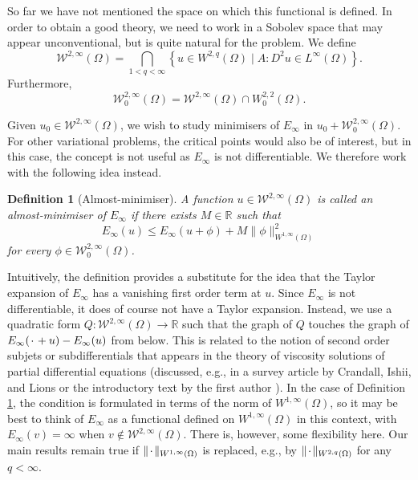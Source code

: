 \documentclass[a4paper]{article}
\newcommand{\R}{\mathbb{R}}
\newcommand{\W}{\mathcal{W}}
\newcommand{\blank}{{\mkern 2mu\cdot\mkern 2mu}}
\newcommand{\set}[2]{\left\{ #1 \mid #2 \right\}}
\newtheorem{definition}[theorem]{Definition}
\theoremstyle{remark}
\begin{document}
So far we have not mentioned the space on which this functional is defined.
In order to obtain a good theory, we need to work in a Sobolev space that
may appear unconventional, but is quite natural for the problem. We define
\[
\W^{2, \infty}(\Omega) = \bigcap_{1 < q < \infty} \set{u \in W^{2, q}(\Omega)}{A : D^2 u \in L^\infty(\Omega)}.
\]
Furthermore,
\[
\W_0^{2, \infty}(\Omega) = \W^{2, \infty}(\Omega) \cap W_0^{2, 2}(\Omega).
\]

Given $u_0 \in \W^{2, \infty}(\Omega)$, we wish to study minimisers of
$E_\infty$ in $u_0 + \W_0^{2, \infty}(\Omega)$. For other variational
problems, the critical points would also be of interest, but in this
case, the concept is not useful as $E_\infty$ is not differentiable.
We therefore work with the following idea instead.

\begin{definition}[Almost-minimiser] \label{def:almost-minimiser}
A function $u \in \W^{2, \infty}(\Omega)$ is called an \emph{al\-most-minimiser}
of $E_\infty$ if there exists $M \in \R$ such that
\[
E_\infty(u) \le E_\infty(u + \phi) + M \|\phi\|_{W^{1, \infty}(\Omega)}^2
\]
for every
$\phi \in \W_0^{2, \infty}(\Omega)$.
\end{definition}

Intuitively, the definition provides a substitute for the idea that the
Taylor expansion of $E_\infty$ has a vanishing first order term at $u$. Since
$E_\infty$ is not differentiable, it does of course not have a Taylor expansion.
Instead, we use a quadratic form $Q \colon \W^{2, \infty}(\Omega) \to \R$ such that
the graph of $Q$ touches the graph of $E_\infty(\blank + u) - E_\infty(u)$ from below.
This is related to the notion of second order subjets or subdifferentials that appears in the
theory of viscosity solutions of partial differential equations
(discussed, e.g., in a survey article by Crandall, Ishii, and Lions \cite{Crandall-Ishii-Lions:92}
or the introductory text by the first author \cite{Katzourakis:15.1}).
In the case of Definition \ref{def:almost-minimiser}, the condition
is formulated in terms of the norm of $W^{1, \infty}(\Omega)$, so it may
be best to think of $E_\infty$ as a functional defined on $W^{1, \infty}(\Omega)$
in this context, with $E_\infty(v) = \infty$ when $v \not\in \W^{2, \infty}(\Omega)$.
There is, however, some flexibility here. Our main results remain true
if $\|\blank\|_{W^{1, \infty}(\Omega)}$
is replaced, e.g., by $\|\blank\|_{W^{2, q}(\Omega)}$ for any $q < \infty$.
\end{document}

